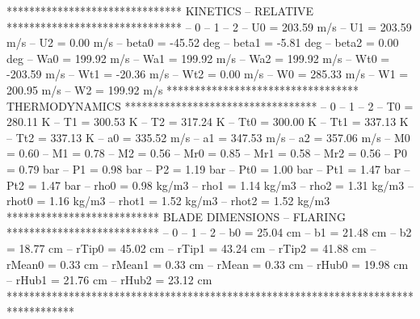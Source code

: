******************************* KINETICS -- RELATIVE *******************************
-- 0                        -- 1                        -- 2
-- U0     =   203.59 m/s    -- U1     =   203.59 m/s    -- U2     =     0.00 m/s
-- beta0  =   -45.52 deg    -- beta1  =    -5.81 deg    -- beta2  =     0.00 deg
-- Wa0    =   199.92 m/s    -- Wa1    =   199.92 m/s    -- Wa2    =   199.92 m/s
-- Wt0    =  -203.59 m/s    -- Wt1    =   -20.36 m/s    -- Wt2    =     0.00 m/s
-- W0     =   285.33 m/s    -- W1     =   200.95 m/s    -- W2     =   199.92 m/s
********************************** THERMODYNAMICS **********************************
-- 0                        -- 1                        -- 2
-- T0     =   280.11 K      -- T1     =   300.53 K      -- T2     =   317.24 K     
-- Tt0    =   300.00 K      -- Tt1    =   337.13 K      -- Tt2    =   337.13 K     
-- a0     =   335.52 m/s    -- a1     =   347.53 m/s    -- a2     =   357.06 m/s   
-- M0     =     0.60        -- M1     =     0.78        -- M2     =     0.56       
-- Mr0    =     0.85        -- Mr1    =     0.58        -- Mr2    =     0.56       
-- P0     =     0.79 bar    -- P1     =     0.98 bar    -- P2     =     1.19 bar   
-- Pt0    =     1.00 bar    -- Pt1    =     1.47 bar    -- Pt2    =     1.47 bar   
-- rho0   =     0.98 kg/m3  -- rho1   =     1.14 kg/m3  -- rho2   =     1.31 kg/m3
-- rhot0  =     1.16 kg/m3  -- rhot1  =     1.52 kg/m3  -- rhot2  =     1.52 kg/m3
*************************** BLADE DIMENSIONS -- FLARING  ***************************
-- 0                        -- 1                        -- 2
-- b0     =    25.04 cm     -- b1     =    21.48 cm     -- b2     =    18.77 cm
-- rTip0  =    45.02 cm     -- rTip1  =    43.24 cm     -- rTip2  =    41.88 cm
-- rMean0 =     0.33 cm     -- rMean1 =     0.33 cm     -- rMean  =     0.33 cm
-- rHub0  =    19.98 cm     -- rHub1  =    21.76 cm     -- rHub2  =    23.12 cm
************************************************************************************